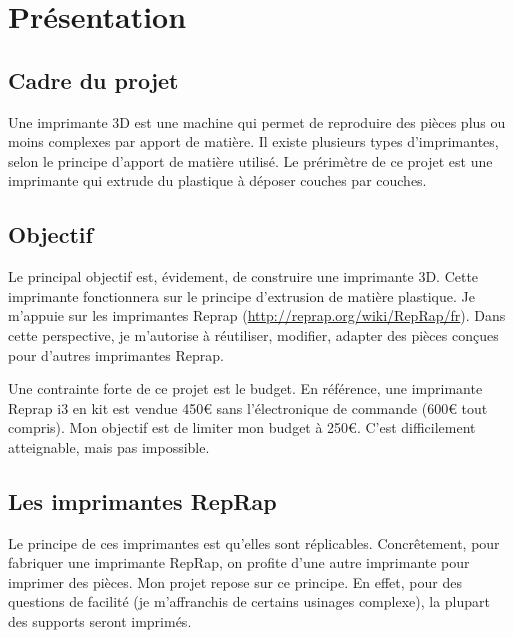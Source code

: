 \section{Présentation}
\subsection{Cadre du projet}
Une imprimante 3D est une machine qui permet de reproduire des pièces %
plus ou moins complexes par apport de matière. Il existe plusieurs types %
d'imprimantes, selon le principe d'apport de matière utilisé. Le prérimètre %
de ce projet est une imprimante qui extrude du plastique à déposer couches %
par couches.
%
\subsection{Objectif}
Le principal objectif est, évidement, de construire une imprimante 3D. Cette %
imprimante fonctionnera sur le principe d'extrusion de matière plastique. Je %
m'appuie sur les imprimantes Reprap (\url{http://reprap.org/wiki/RepRap/fr}). %
Dans cette perspective, je m'autorise à réutiliser, modifier, adapter des pièces %
conçues pour d'autres imprimantes Reprap.\par%
%
Une contrainte forte de ce projet est le budget. En référence, une imprimante %
Reprap i3 en kit est vendue 450\euro{} sans l'électronique de commande (600\euro{} tout %
compris). Mon objectif est de limiter mon budget à 250\euro{}. C'est difficilement %
atteignable, mais pas impossible.
%
\subsection{Les imprimantes RepRap}
Le principe de ces imprimantes est qu'elles sont réplicables. Concrêtement, %
pour fabriquer une imprimante RepRap, on profite d'une autre imprimante pour imprimer %
des pièces. Mon projet %
repose sur ce principe. En effet, pour des questions de facilité (je m'affranchis %
de certains usinages complexe), la plupart des supports seront imprimés.